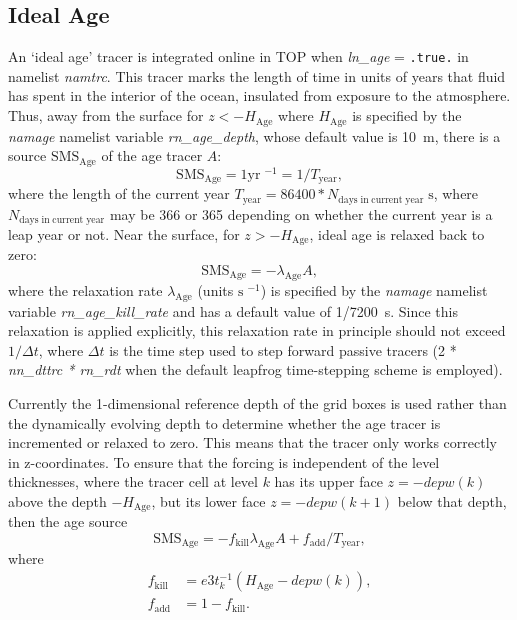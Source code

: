 \documentclass[../main/TOP_manual]{subfiles}
\begin{document}
\subsection{Ideal Age}
%


 An `ideal age' tracer is integrated online in TOP when \textit{ln\_age} = \texttt{.true.} in namelist \textit{namtrc}. This tracer marks the length of time in units of years that fluid has spent in the interior of the ocean, insulated from exposure to the atmosphere. Thus, away from the surface for $z<-H_{\mathrm{Age}}$ where $H_{\mathrm{Age}}$ is specified by the \textit{namage} namelist variable \textit{rn\_age\_depth}, whose default value is 10~m, there is a source $\mathrm{SMS_{\mathrm{Age}}}$ of the age tracer $A$:
\begin{equation}
  \label{eq:TOP-age-interior}
  \mathrm{SMS_{\mathrm{Age}}} = 1 \mathrm{yr}\;^{-1} = 1/T_{\mathrm{year}},
 \end{equation}
 where the length of the current year $T_{\mathrm{year}} = 86400*N_{\mathrm{days\;in\;current\; year}}\;\mathrm{s}$, where $N_{\mathrm{days\;in\;current\; year}}$ may be 366 or 365 depending on whether the current year is a leap year or not.
 Near the surface, for $z>-H_{\mathrm{Age}}$, ideal age is relaxed back to zero:
\begin{equation}
  \label{eq:TOP-age-surface}
   \mathrm{SMS_{\mathrm{Age}}} = -\lambda_{\mathrm{Age}}A,
 \end{equation}
 where the relaxation rate $\lambda_{\mathrm{Age}}$  (units $\mathrm{s}\;^{-1}$) is specified by the \textit{namage} namelist variable \textit{rn\_age\_kill\_rate} and has a default value of 1/7200~s. Since this relaxation is applied explicitly, this relaxation rate in principle should not exceed $1/\Delta t$, where $\Delta t$ is the time step used to step forward passive tracers (2 * \textit{nn\_dttrc * rn\_rdt} when the default  leapfrog time-stepping scheme is employed).

 Currently the 1-dimensional reference depth of the grid boxes is used rather than the dynamically evolving depth to determine whether the age tracer is incremented or relaxed to zero. This means that the tracer only works correctly in z-coordinates. To ensure that the forcing is independent of the level thicknesses, where the tracer cell at level $k$ has its upper face $z=-depw(k)$ above the depth $-H_{\mathrm{Age}}$, but its lower face $z=-depw(k+1)$ below that depth, then the age source
 \begin{equation}
  \label{eq:TOP-age-mixed}
   \mathrm{SMS_{\mathrm{Age}}} = -f_{\mathrm{kill}}\lambda_{\mathrm{Age}}A +f_{\mathrm{add}}/T_{\mathrm{year}} ,
 \end{equation}
 where
 \begin{align}
    f_{\mathrm{kill}} &= e3t_k^{-1}(H_{\mathrm{Age}} - depw(k)) , \\
    f_{\mathrm{add}} &= 1 - f_{\mathrm{kill}}.
 \end{align}
\end{document}
